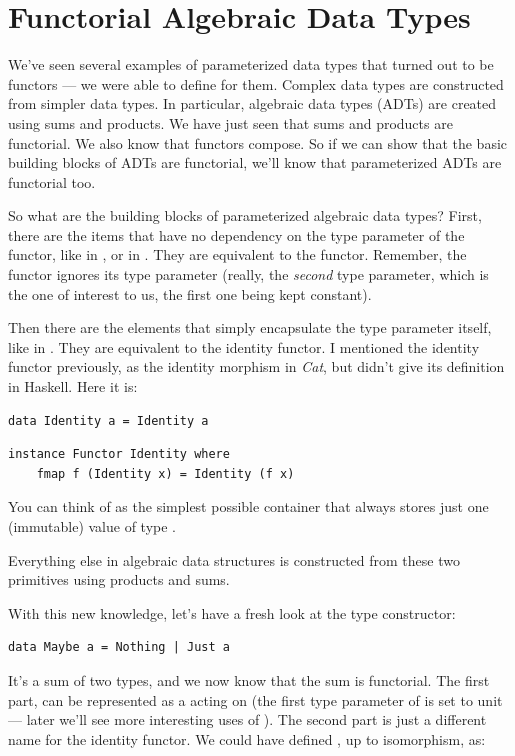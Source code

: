 \section{Functorial Algebraic Data
Types}\label{functorial-algebraic-data-types}

We've seen several examples of parameterized data types that turned out
to be functors --- we were able to define  for them.
Complex data types are constructed from simpler data types. In
particular, algebraic data types (ADTs) are created using sums and
products. We have just seen that sums and products are functorial. We
also know that functors compose. So if we can show that the basic
building blocks of ADTs are functorial, we'll know that parameterized
ADTs are functorial too.

So what are the building blocks of parameterized algebraic data types?
First, there are the items that have no dependency on the type parameter
of the functor, like  in , or 
in . They are equivalent to the  functor.
Remember, the  functor ignores its type parameter (really,
the \emph{second} type parameter, which is the one of interest to us,
the first one being kept constant).

Then there are the elements that simply encapsulate the type parameter
itself, like  in . They are equivalent to the
identity functor. I mentioned the identity functor previously, as the
identity morphism in \emph{Cat}, but didn't give its definition in
Haskell. Here it is:

\begin{verbatim}
data Identity a = Identity a
\end{verbatim}

\begin{verbatim}
instance Functor Identity where
    fmap f (Identity x) = Identity (f x)
\end{verbatim}
You can think of  as the simplest possible container
that always stores just one (immutable) value of type .

Everything else in algebraic data structures is constructed from these
two primitives using products and sums.

With this new knowledge, let's have a fresh look at the 
type constructor:

\begin{verbatim}
data Maybe a = Nothing | Just a
\end{verbatim}
It's a sum of two types, and we now know that the sum is functorial. The
first part,  can be represented as a 
acting on  (the first type parameter of  is set
to unit --- later we'll see more interesting uses of ).
The second part is just a different name for the identity functor. We
could have defined , up to isomorphism, as:


